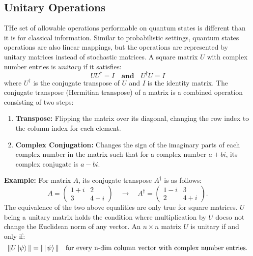 \documentclass[11pt]{scrartcl}
\begin{document}
\subsection{Unitary Operations}
THe set of allowable operations performable on quantum states is different than it is for classical information.
Similar to probabilistic settings, quantum states operations are also linear mappings, but the operations are represented by unitary matrices instead of stochastic matrices.\vspace{2mm}
\newline
A square matrix $U$ with complex number entries is $unitary$ if it satisfies:
$$UU^{\dagger} = I \quad \textbf{and} \quad U^{\dagger}U = I$$ 
where $U^{\dagger}$ is the conjugate transpose of $U$ and $I$ is the identity matrix.
The conjugate transpose (Hermitian transpose) of a matrix is a combined operation consisting of two steps:
\begin{enumerate}
	\item \textbf{Transpose:} Flipping the matrix over its diagonal, changing the row index to the column index for each element.
	\item \textbf{Complex Conjugation:} Changes the sign of the imaginary parts of each complex number in the matrix such that for a complex number
	$a + bi$, its complex conjugate is $a - bi$.
\end{enumerate}
\textbf{Example:} For matrix $A$, its conjugate transpose \( A^{\dagger} \) is as follows:
\[
A = \begin{pmatrix}
1 + i & 2 \\
3 & 4 - i
\end{pmatrix}
\quad \rightarrow \quad
A^{\dagger} = \begin{pmatrix}
1 - i & 3 \\
2 & 4 + i
\end{pmatrix}.
\]
The equivalence of the two above equalities are only true for square matrices.
$U$ being a unitary matrix holds the condition where multiplication by $U$
doeso not change the Euclidean norm of any vector. An $n \times n$ matrix $U$ is unitary if and only if:
$$\|U\ket{\psi}\| = \|\ket{\psi}\| \quad\text{for every n-dim column vector with complex number entries.}$$
\end{document}
